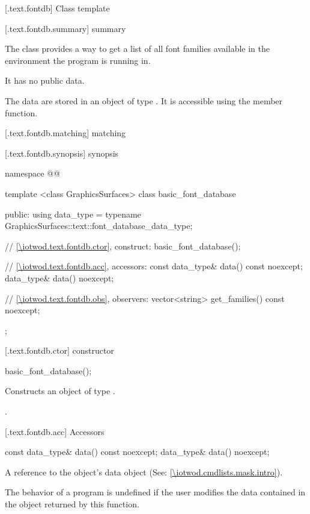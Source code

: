 
 [\iotwod.text.fontdb] {Class template }

 [\iotwod.text.fontdb.summary] { summary}

\pnum
{}%
The  class provides a way to get a list of all font families available in the environment the program is running in.

\pnum
It has no public data.

\pnum
The data are stored in an object of type . It is accessible using the  member function.

 [\iotwod.text.fontdb.matching]{ matching}

 [\iotwod.text.fontdb.synopsis] { synopsis}

\begin{codeblock}
namespace @\fullnamespace{}@ {
  template <class GraphicsSurfaces>
  class basic_font_database {
  public:
    using data_type = typename GraphicsSurfaces::text::font_database_data_type;

    // \ref{\iotwod.text.fontdb.ctor}, construct:
    basic_font_database();

    // \ref{\iotwod.text.fontdb.acc}, accessors:
    const data_type& data() const noexcept;
    data_type& data() noexcept;

    // \ref{\iotwod.text.fontdb.obs}, observers:
    vector<string> get_families() const noexcept;
  };
}
\end{codeblock}

 [\iotwod.text.fontdb.ctor] { constructor}

%
\begin{itemdecl}
basic_font_database();
\end{itemdecl}
\begin{itemdescr}
\pnum
\effects Constructs an object of type .

\pnum
\postconditions {}.
\end{itemdescr}

 [\iotwod.text.fontdb.acc] {Accessors}%

%
\begin{itemdecl}
const data_type& data() const noexcept;
data_type& data() noexcept;
\end{itemdecl}
\begin{itemdescr}
\pnum
\returns A reference to the  object's data object (See: \ref{\iotwod.cmdlists.mask.intro}).

\pnum
\remarks The behavior of a program is undefined if the user modifies the data contained in the  object returned by this function.
\end{itemdescr}

